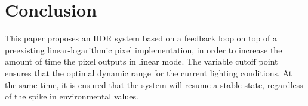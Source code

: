 \section{Conclusion}

This paper proposes an HDR system based on a feedback loop on top of a preexisting linear-logarithmic pixel implementation, in order
to increase the amount of time the pixel outputs in linear mode. The variable cutoff point ensures that the optimal
dynamic range for the current lighting conditions. At the same time, it is ensured that the system will resume a stable
state, regardless of the spike in environmental values.
